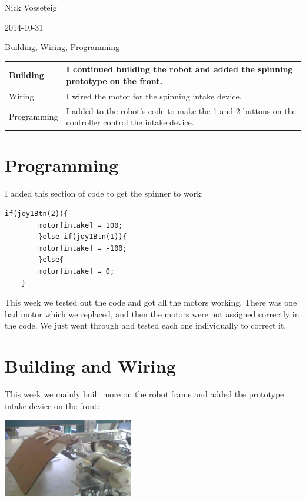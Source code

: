 Nick Vosseteig

2014-10-31

Building, Wiring, Programming

\begin{tabular}{|p{5cm}|p{5cm}|}
 \hline
 Building&
I continued building the robot and added the spinning prototype on the front.
 \\
 \hline
Wiring&
I wired the motor for the spinning intake device.
 \\
 \hline
Programming&
I added to the robot's code to make the 1 and 2 buttons on the controller control the intake device.
 \\
 \hline
\end{tabular}

\section*{Programming}
I added this section of code to get the spinner to work:
\begin{lstlisting}[style = RobotC]	
	if(joy1Btn(2)){
		motor[intake] = 100;
		}else if(joy1Btn(1)){
		motor[intake] = -100;
		}else{
		motor[intake] = 0;
	}
\end{lstlisting}
This week we tested out the code and got all the  motors working. There was one bad motor which we replaced, and then the motors were not assigned correctly in the code. We just went through and tested each one individually to correct it.

\section*{Building and Wiring}
This week we mainly built more on the robot frame and added the prototype intake device on the front:

\begin{center}
 \includegraphics[width=215px]{./Entries/Images/intake_device2.jpg}
\end{center}

